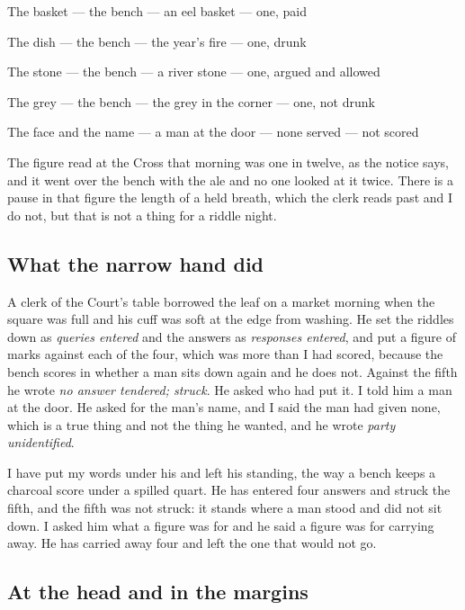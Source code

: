 \documentclass{design/chronicle}
\begin{document}
The basket — the bench — an eel basket — one, paid\par

The dish — the bench — the year’s fire — one, drunk\par

The stone — the bench — a river stone — one, argued and allowed\par

The grey — the bench — the grey in the corner — one, not drunk\par

The face and the name — a man at the door — none served — not scored\par

The figure read at the Cross that morning was one in twelve, as the notice says, and it went over the bench with the ale and no one looked at it twice. There is a pause in that figure the length of a held breath, which the clerk reads past and I do not, but that is not a thing for a riddle night.

\subsection*{What the narrow hand did}

A clerk of the Court’s table borrowed the leaf on a market morning when the square was full and his cuff was soft at the edge from washing. He set the riddles down as \emph{queries entered} and the answers as \emph{responses entered}, and put a figure of marks against each of the four, which was more than I had scored, because the bench scores in whether a man sits down again and he does not. Against the fifth he wrote \emph{no answer tendered; struck}. He asked who had put it. I told him a man at the door. He asked for the man’s name, and I said the man had given none, which is a true thing and not the thing he wanted, and he wrote \emph{party unidentified}.

I have put my words under his and left his standing, the way a bench keeps a charcoal score under a spilled quart. He has entered four answers and struck the fifth, and the fifth was not struck: it stands where a man stood and did not sit down. I asked him what a figure was for and he said a figure was for carrying away. He has carried away four and left the one that would not go.

\subsection*{At the head and in the margins}
\end{document}
